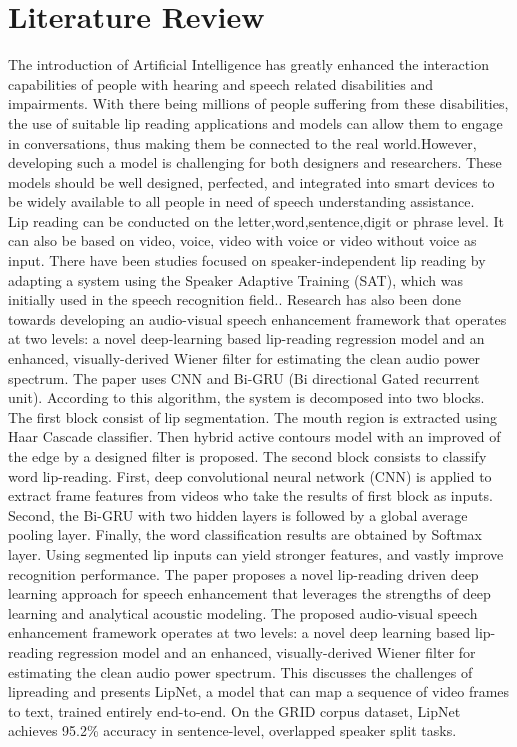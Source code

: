     \chapter{Literature Review}
    The introduction of Artificial Intelligence has greatly enhanced the interaction capabilities of people with hearing and speech related disabilities and impairments. With there being millions of people suffering from these disabilities, the use of suitable lip reading applications and models can allow them to engage in conversations, thus making them be connected to the real world.However, developing such a model is challenging for both designers and researchers. These models should be well designed,
perfected, and integrated into smart devices to be widely available to all people in need of speech understanding assistance.
\\Lip reading can be conducted on the letter,word,sentence,digit or phrase level. It can also be based on video, voice, video with voice or video without voice as input. There have been studies focused on speaker-independent lip reading by adapting a system using the Speaker Adaptive Training (SAT), which was initially used in the speech recognition field.\cite{almajai2016improved}. 
Research has also been done towards developing an audio-visual speech enhancement framework that operates at two levels: a novel deep-learning based lip-reading regression model and an enhanced, visually-derived Wiener filter for estimating the clean audio power spectrum.\cite{adeel2019lip}
The paper\cite{miled2023lip} uses CNN and Bi-GRU (Bi directional Gated recurrent unit). According to this algorithm, the system is decomposed into two blocks. The first block consist of lip segmentation. The mouth region is extracted using Haar Cascade classifier. Then hybrid active contours model with an improved of the edge by a designed filter is proposed. The second block consists to classify word lip-reading. First, deep convolutional neural network (CNN) is applied to extract frame features from videos who take the results of first block as inputs. Second, the Bi-GRU with two hidden layers is followed by a global average pooling layer. Finally, the word classification results are obtained by Softmax layer. Using segmented lip inputs can yield stronger features, and vastly improve recognition performance.
The paper\cite{assael2016lipnet} proposes a novel lip-reading driven deep learning approach for speech enhancement that leverages the strengths of deep learning and analytical acoustic modeling. The proposed audio-visual speech enhancement framework operates at two levels: a novel deep learning based lip-reading regression model and an enhanced, visually-derived Wiener filter for estimating the clean audio power spectrum. This  discusses the challenges of lipreading and presents LipNet, a model that can map a sequence of video frames to text, trained entirely end-to-end. On the GRID corpus dataset, LipNet achieves 95.2\% accuracy in sentence-level, overlapped speaker split tasks.
